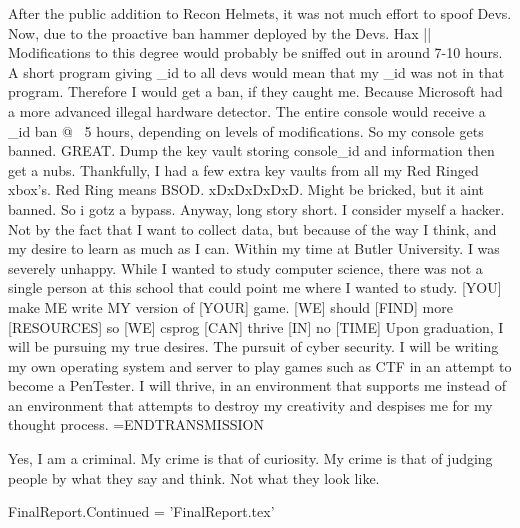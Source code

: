 After the public addition to Recon Helmets, it was not much effort to spoof Devs.
Now, due to the proactive ban hammer deployed by the Devs. Hax || Modifications to this degree
would probably be sniffed out in around 7-10 hours. A short program giving _id to all devs
would mean that my _id was not in that program. Therefore I would get a ban, if they caught me.
Because Microsoft had a more advanced illegal hardware detector. The entire console would receive
a _id ban @ ~5 hours, depending on levels of modifications. 
So my console gets banned. GREAT. Dump the key vault storing console_id and information
then get a nubs. Thankfully, I had a few extra key vaults from all my Red Ringed xbox's.
Red Ring means BSOD. xDxDxDxDxD. Might be bricked, but it aint banned. So i gotz a bypass.
Anyway, long story short. I consider myself a hacker. Not by the fact that I want to collect data,
but because of the way I think, and my desire to learn as much as I can. 
Within my time at Butler University. I was severely unhappy. While I wanted to study computer science,
there was not a single person at this school that could point me where I wanted to study.
[YOU] make {ME} write {MY} version of [YOUR] game.
[WE] should [FIND] more [RESOURCES] so [WE] csprog [CAN] thrive [IN] no [TIME]
Upon graduation, I will be pursuing my true desires. The pursuit of cyber security.
I will be writing my own operating system and server to play games such as CTF
in an attempt to become a PenTester. I will thrive, in an environment that supports me
instead of an environment that attempts to destroy my creativity and despises me for my thought process.
=ENDTRANSMISSION

Yes, I am a criminal. My crime is that of curiosity. 
My crime is that of judging people by what they say and think. 
Not what they look like.

FinalReport.Continued = 'FinalReport.tex'

